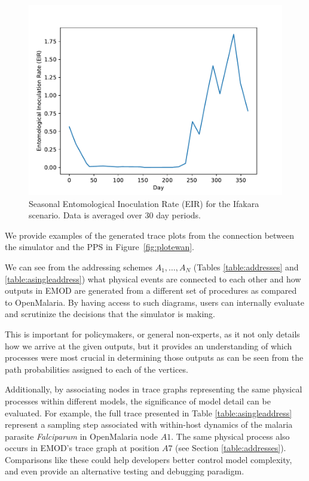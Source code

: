 \documentclass{article}
\begin{document}
\begin{figure}
	\centering
	\includegraphics[width=\textwidth/2]{../plots/EIR_Ifakara.pdf}
  \vspace{-20pt}
	\caption{Seasonal Entomological Inoculation Rate (EIR) for the Ifakara scenario. Data is averaged over $30$ day periods.}
	\label{fig:EIR}
  \vspace{-10pt}
\end{figure}

We provide examples of the generated trace plots from the connection between the simulator and the PPS in Figure~\ref{fig:plotewan}. 

We can see from the addressing schemes $A_1, \ldots, A_N$ (Tables \ref{table:addresses} and \ref{table:asingleaddress}) what physical events are connected to each other and how outputs in EMOD are generated from a different set of procedures as compared to OpenMalaria.
By having access to such diagrams, users can internally evaluate and scrutinize the decisions that the simulator is making.

This is important for policymakers, or general non-experts, as it not only details how we arrive at the given outputs, but it provides an understanding of which processes were most crucial in determining those outputs as can be seen from the path probabilities assigned to each of the vertices. 

Additionally, by associating nodes in trace graphs representing the same physical processes within different models, the significance of model detail can be evaluated. For example, the full trace presented in Table \ref{table:asingleaddress} represent a sampling step associated with within-host dynamics of the malaria parasite \textit{Falciparum} in OpenMalaria node $A1$. The same physical process also occurs in EMOD's trace graph at position $A7$ (see Section \ref{table:addresses}).
Comparisons like these could help developers better control model complexity, and even provide an alternative testing and debugging paradigm.
\end{document}
